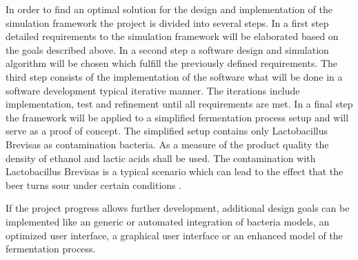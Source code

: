 In order to find an optimal solution for the design and implementation of the simulation framework the project is divided into several steps.
In a first step detailed requirements to the simulation framework will be elaborated based on the goals described above. In a second step
a software design and simulation algorithm will be chosen which fulfill the previously defined requirements. The third step consists of the
implementation of the software what will be done in a software development typical iterative manner. The iterations include implementation,
test and refinement until all requirements are met. In a final step the framework will be applied to a simplified fermentation process setup
and will serve as a proof of concept. The simplified setup contains only Lactobacillus Brevisas as contamination bacteria. As a measure of
the product quality the density of ethanol and lactic acids shall be used. The contamination with Lactobacillus Brevisas is a typical
scenario which can lead to the effect that the beer turns sour under certain conditions \cite{JIB:JIB49}.

If the project progress allows further development, additional design goals can be implemented like an generic or automated integration of
bacteria models, an optimized user interface, a graphical user interface or an enhanced model of the fermentation process.

